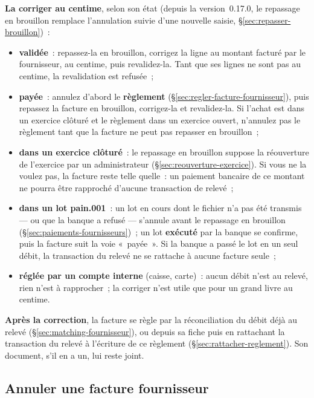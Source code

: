 \documentclass[a4paper,11pt,oneside]{article}
\begin{document}
\textbf{La corriger au centime}, selon son état (depuis la version~0.17.0, le repassage en
brouillon remplace l'annulation suivie d'une nouvelle saisie, \S\ref{sec:repasser-brouillon})~:
\begin{itemize}
    \item \textbf{validée}~: repassez-la en brouillon, corrigez la ligne au montant facturé par le
          fournisseur, au centime, puis revalidez-la. Tant que ses lignes ne sont pas au centime,
          la revalidation est refusée~;
    \item \textbf{payée}~: annulez d'abord le \textbf{règlement}
          (\S\ref{sec:regler-facture-fournisseur}), puis repassez la facture en brouillon,
          corrigez-la et revalidez-la. Si l'achat est dans un exercice clôturé et le règlement
          dans un exercice ouvert, n'annulez pas le règlement tant que la facture ne peut pas
          repasser en brouillon~;
    \item \textbf{dans un exercice clôturé}~: le repassage en brouillon suppose la réouverture de l'exercice
          par un administrateur (\S\ref{sec:reouverture-exercice}). Si vous ne la voulez pas, la
          facture reste telle quelle~: un paiement bancaire de ce montant ne pourra être rapproché
          d'aucune transaction de relevé~;
    \item \textbf{dans un lot pain.001}~: un lot en cours dont le fichier n'a pas été transmis
          --- ou que la banque a refusé --- s'annule avant le repassage en brouillon (\S\ref{sec:paiements-fournisseurs})~;
          un lot \textbf{exécuté} par la banque se confirme, puis la facture suit la voie
          «~payée~». Si la banque a passé le lot en un seul débit, la transaction du relevé ne se
          rattache à aucune facture seule~;
    \item \textbf{réglée par un compte interne} (caisse, carte)~: aucun débit n'est au relevé, rien
          n'est à rapprocher~; la corriger n'est utile que pour un grand livre au centime.
\end{itemize}

\textbf{Après la correction}, la facture se règle par la réconciliation du débit déjà au
relevé (\S\ref{sec:matching-fournisseur}), ou depuis sa fiche puis en rattachant la transaction du
relevé à l'écriture de ce règlement (\S\ref{sec:rattacher-reglement}). Son document, s'il en a un,
lui reste joint.

\subsection{Annuler une facture fournisseur}
\label{sec:annuler-facture-fournisseur}
\end{document}
